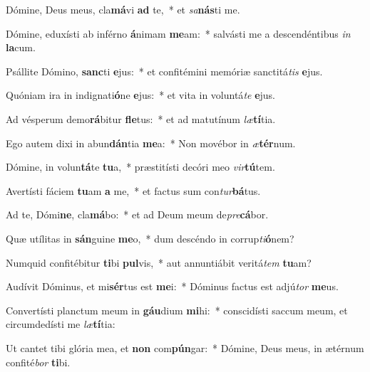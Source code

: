 \item Dómine, Deus meus, cla\textbf{má}vi \textbf{ad} te,~* et \textit{sa}\textbf{nás}ti me.
\item Dómine, eduxísti ab inférno \textbf{á}nimam \textbf{me}am:~* salvásti me a descendéntibus \textit{in} \textbf{la}cum.
\item Psállite Dómino, \textbf{sanc}ti \textbf{e}jus:~* et confitémini memóriæ sanctitá\textit{tis} \textbf{e}jus.
\item Quóniam ira in indignati\textbf{ó}ne \textbf{e}jus:~* et vita in voluntá\textit{te} \textbf{e}jus.
\item Ad vésperum demo\textbf{rá}bitur \textbf{fle}tus:~* et ad matutínum \textit{læ}\textbf{tí}tia.
\item Ego autem dixi in abun\textbf{dán}tia \textbf{me}a:~* Non movébor in \textit{æ}\textbf{tér}num.
\item Dómine, in volun\textbf{tá}te \textbf{tu}a,~* præstitísti decóri meo \textit{vir}\textbf{tú}tem.
\item Avertísti fáciem \textbf{tu}am \textbf{a} me,~* et factus sum con\textit{tur}\textbf{bá}tus.
\item Ad te, Dómi\textbf{ne}, cla\textbf{má}bo:~* et ad Deum meum de\textit{pre}\textbf{cá}bor.
\item Quæ utílitas in \textbf{sán}guine \textbf{me}o,~* dum descéndo in corrup\textit{ti}\textbf{ó}nem?
\item Numquid confitébitur \textbf{ti}bi \textbf{pul}vis,~* aut annuntiábit veritá\textit{tem} \textbf{tu}am?
\item Audívit Dóminus, et mi\textbf{sér}tus est \textbf{me}i:~* Dóminus factus est adjú\textit{tor} \textbf{me}us.
\item Convertísti planctum meum in \textbf{gáu}dium \textbf{mi}hi:~* conscidísti saccum meum, et circumdedísti me \textit{læ}\textbf{tí}tia:
\item Ut cantet tibi glória mea, et \textbf{non} com\textbf{pún}gar:~* Dómine, Deus meus, in ætérnum confité\textit{bor} \textbf{ti}bi.
